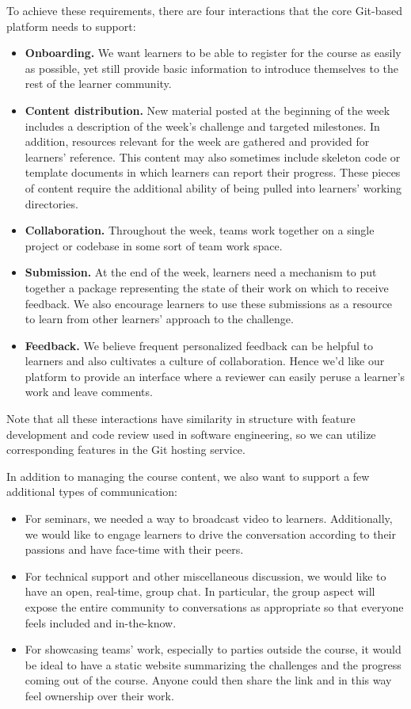 \documentclass[12pt,twoside,vi]{mitthesis}
\begin{document}
To achieve these requirements, there are four interactions that the core Git-based platform needs to support:
\begin{itemize}
\item \textbf{Onboarding.} We want learners to be able to register for the course as easily as possible, yet still provide basic information to introduce themselves to the rest of the learner community. 
\item \textbf{Content distribution.} New material posted at the beginning of the week includes a description of the week's challenge and targeted milestones. In addition, resources relevant for the week are gathered and provided for learners' reference. This content may also sometimes include skeleton code or template documents in which learners can report their progress. These pieces of content require the additional ability of being pulled into learners' working directories.
\item \textbf{Collaboration.} Throughout the week, teams work together on a single project or codebase in some sort of team work space. 
\item \textbf{Submission.} At the end of the week, learners need a mechanism to put together a package representing the state of their work on which to receive feedback. We also encourage learners to use these submissions as a resource to learn from other learners' approach to the challenge.
\item \textbf{Feedback.} We believe frequent personalized feedback can be helpful to learners and also cultivates a culture of collaboration. Hence we'd like our platform to provide an interface where a reviewer can easily peruse a learner's work and leave comments. 
\end{itemize}
Note that all these interactions have similarity in structure with feature development and code review used in software engineering, so we can utilize corresponding features in the Git hosting service.

In addition to managing the course content, we also want to support a few additional types of communication:
\begin{itemize}
\item For seminars, we needed a way to broadcast video to learners. Additionally, we would like to engage learners to drive the conversation according to their passions and have face-time with their peers.
\item For technical support and other miscellaneous discussion, we would like to have an open, real-time, group chat. In particular, the group aspect will expose the entire community to conversations as appropriate so that everyone feels included and in-the-know.
\item For showcasing teams' work, especially to parties outside the course, it would be ideal to have a static website summarizing the challenges and the progress coming out of the course. Anyone could then share the link and in this way feel ownership over their work.
\end{itemize}
\end{document}
